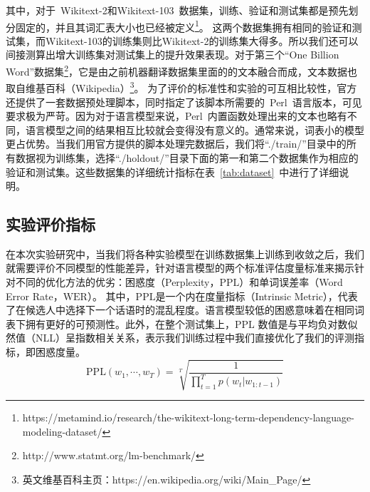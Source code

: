 其中，对于~Wikitext-2和Wikitext-103~数据集，训练、验证和测试集都是预先划分固定的，并且其词汇表大小也已经被定义\footnote{https://metamind.io/research/the-wikitext-long-term-dependency-language-modeling-dataset/}。
这两个数据集拥有相同的验证和测试集，而Wikitext-103的训练集则比Wikitext-2的训练集大得多。所以我们还可以间接测算出增大训练集对测试集上的提升效果表现。对于第三个``One Billion Word''数据集\footnote{http://www.statmt.org/lm-benchmark/}，它是由之前机器翻译数据集里面的的文本融合而成，文本数据也取自维基百科（Wikipedia）\footnote{英文维基百科主页：https://en.wikipedia.org/wiki/Main\_Page/}。
为了评价的标准性和实验的可互相比较性，官方还提供了一套数据预处理脚本，同时指定了该脚本所需要的~Perl~语言版本，可见要求极为严苛。因为对于语言模型来说，Perl~内置函数处理出来的文本也略有不同，语言模型之间的结果相互比较就会变得没有意义的。通常来说，词表小的模型更占优势。当我们用官方提供的脚本处理完数据后，我们将``./train/''目录中的所有数据视为训练集，选择``./holdout/''目录下面的第一和第二个数据集作为相应的验证和测试集。这些数据集的详细统计指标在表~\ref{tab:dataset}~中进行了详细说明。

\subsection{实验评价指标}
在本次实验研究中，当我们将各种实验模型在训练数据集上训练到收敛之后，我们就需要评价不同模型的性能差异，针对语言模型的两个标准评估度量标准来揭示针对不同的优化方法的优劣：困惑度（Perplexity，$ \mathrm{PPL} $）和单词误差率（Word Error Rate，$\mathrm{WER} $）。
其中，$ \mathrm{PPL} $是一个内在度量指标（Intrinsic Metric），代表了在候选人中选择下一个话语时的混乱程度。语言模型较低的困惑意味着在相同词表下拥有更好的可预测性。此外，在整个测试集上，$\mathrm{PPL}$ 数值是与平均负对数似然值（NLL）呈指数相关关系，表示我们训练过程中我们直接优化了我们的评测指标，即困惑度量。
\begin{equation}\label{equ:ppl}
   \mathrm{PPL}(w_1,\cdots,w_T)=\sqrt[T]{\frac{1}{\prod_{t=1}^T p(w_t|w_{1:t-1})}}
\end{equation}

